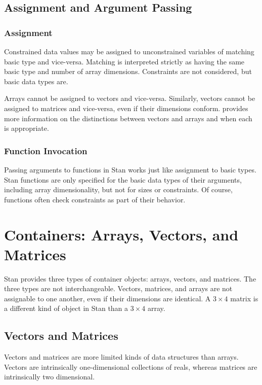 \section{Assignment and Argument Passing}

\subsection{Assignment}

Constrained data values may be assigned to unconstrained variables of
matching basic type and vice-versa.   Matching is interpreted strictly
as having the same basic type and number of array dimensions.
Constraints are not considered, but basic data types are.  

Arrays cannot be assigned to vectors and vice-versa.  Similarly,
vectors cannot be assigned to matrices and vice-versa, even if their
dimensions conform.   provides more information
on the distinctions between vectors and arrays and when each is
appropriate.

\subsection{Function Invocation}

Passing arguments to functions in Stan works just like assignment to
basic types.  Stan functions are only specified for the basic data
types of their arguments, including array dimensionality, but not for
sizes or constraints.  Of course, functions often check constraints as
part of their behavior.  



\chapter{Containers: Arrays, Vectors, and Matrices}\label{containers.chapter}

\noindent
Stan provides three types of container objects: arrays, vectors, and
matrices.  The three types are not interchangeable.  Vectors, matrices,
and arrays are not assignable to one another, even if their dimensions
are identical.  A $3 \times 4$ matrix is a different kind of object in
Stan than a $3 \times 4$ array. 

\section{Vectors and Matrices}

Vectors and matrices are more limited kinds of data structures than
arrays.  Vectors are intrinsically one-dimensional collections of
reals, whereas matrices are intrinsically two dimensional. 

